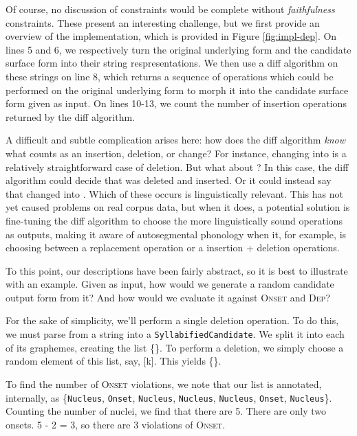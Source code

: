 \documentclass[12pt]{article}
\newcommand{\dep}{\textsc{Dep}}
\newcommand{\onset}{\textsc{Onset}}
\begin{document}
Of course, no discussion of constraints would be complete without
\textit{faithfulness} constraints. These present an interesting challenge,
but we first provide an overview of the implementation, which is provided
in Figure \ref{fig:impl-dep}. On lines 5 and 6, we respectively turn the
original underlying form and the candidate surface form into their string
respresentations. We then use a diff algorithm on these strings on line 8,
which returns a sequence of operations which could be performed on the
original underlying form to morph it into the candidate surface form given
as input. On lines 10-13, we count the number of insertion operations
returned by the diff algorithm.

A difficult and subtle complication arises here: how does the diff
algorithm \textit{know} what counts as an insertion, deletion, or change?
For instance, changing  into
\textipa{[ow\'ok\'ow\'o]} is a relatively straightforward case of
deletion. But what about \textipa{[ow\'ak\'iow\'o]}? In this case, the
diff algorithm could decide that \textipa{[\'o]} was deleted and
\textipa{[\'a]} inserted. Or it could instead say that \textipa{[\'o]}
changed into \textipa{[\'a]}. Which of these occurs is linguistically
relevant. This has not yet caused problems on real corpus data, but
when it does, a potential solution is fine-tuning the diff algorithm
to choose the more linguistically sound operations as outputs, making
it aware of autosegmental phonology when it, for example, is choosing
between a replacement operation or a insertion + deletion operations.

To this point, our descriptions have been fairly abstract, so it is best
to illustrate with an example. Given  as
input, how would we generate a random candidate output form from it?
And how would we evaluate it against \onset{} and \dep?

For the sake of simplicity, we'll perform a single deletion operation.
To do this, we must parse  from a string
into a \texttt{SyllabifiedCandidate}. We split it into each of its
graphemes, creating the list \{\}. To
perform a deletion, we simply choose a random element of this list,
say, [k]. This yields \{\}.

To find the number of \onset{} violations, we note that our list is
annotated, internally, as \{\texttt{Nucleus}, \texttt{Onset},
\texttt{Nucleus}, \texttt{Nucleus}, \texttt{Nucleus}, \texttt{Onset},
\texttt{Nucleus}\}. Counting the number of nuclei, we find that there
are 5. There are only two onsets. 5 - 2 = 3, so there are 3
violations of \onset.
\end{document}

